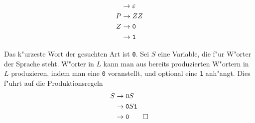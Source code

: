\begin{loesung}
\begin{teilaufgaben}
\begin{align*}
 &\rightarrow \varepsilon\\
P&\rightarrow ZZ\\
Z&\rightarrow {\tt 0}\\
 &\rightarrow {\tt 1}
\end{align*}
\item
Das k"urzeste Wort der gesuchten Art ist {\tt 0}. Sei $S$ eine
Variable, die f"ur W"orter der Sprache steht. W"orter in $L$
kann man aus bereits produzierten W"ortern in $L$ produzieren,
indem man  eine {\tt 0} voranstellt, und optional eine {\tt 1}
anh"angt. Dies f"uhrt auf die Produktionsregeln
\begin{align*}
S&\rightarrow {\tt 0}S\\
 &\rightarrow {\tt 0}S{\tt 1}\\
 &\rightarrow {\tt 0}
\qedhere
\end{align*}
\end{teilaufgaben}
\end{loesung}

